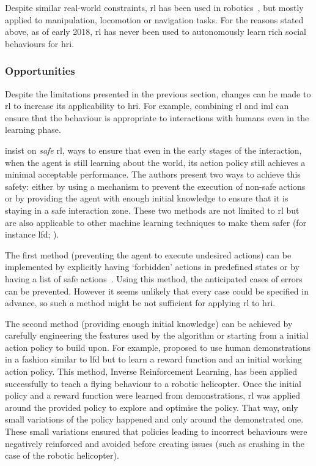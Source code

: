 	Despite similar real-world constraints, \gls{rl} has been used in robotics~\citep{kober2013reinforcement}, but mostly applied to manipulation, locomotion or navigation tasks. For the reasons stated above, as of early 2018, \gls{rl} has never been used to autonomously learn rich social behaviours for \gls{hri}. 
	
	\subsubsection{Opportunities}  
	Despite the limitations presented in the previous section, changes can be made to \gls{rl} to increase its applicability to \gls{hri}. For example, combining \gls{rl} and \gls{iml} can ensure that the behaviour is appropriate to interactions with humans even in the learning phase.
	
	\cite{garcia2015comprehensive} insist on \textit{safe} \gls{rl}, ways to ensure that even in the early stages of the interaction, when the agent is still learning about the world, its action policy still achieves a minimal acceptable performance. The authors present two ways to achieve this safety: either by using a mechanism to prevent the execution of non-safe actions or by providing the agent with enough initial knowledge to ensure that it is staying in a safe interaction zone. These two methods are not limited to \gls{rl} but are also applicable to other machine learning techniques to make them safer (for instance \gls{lfd}; \citealt{billard2008robot}). 
	
	The first method (preventing the agent to execute undesired actions) can be implemented by explicitly having `forbidden' actions in predefined states or by having a list of safe actions~\citep{alshiekh2017safe}. Using this method, the anticipated cases of errors can be prevented. However it seems unlikely that every case could be specified in advance, so such a method might be not sufficient for applying \gls{rl} to \gls{hri}. %
	
	The second method (providing enough initial knowledge) can be achieved by carefully engineering the features used by the algorithm or starting from a initial action policy to build upon. For example, \cite{abbeel2004apprenticeship} proposed to use human demonstrations in a fashion similar to \gls{lfd} but to learn a reward function and an initial working action policy. This method, Inverse Reinforcement Learning, has been applied successfully to teach a flying behaviour to a robotic helicopter. Once the initial policy and a reward function were learned from demonstrations, \gls{rl} was applied around the provided policy to explore and optimise the policy. That way, only small variations of the policy happened and only around the demonstrated one. These small variations ensured that policies leading to incorrect behaviours were negatively reinforced and avoided before creating issues (such as crashing in the case of the robotic helicopter). 
	
